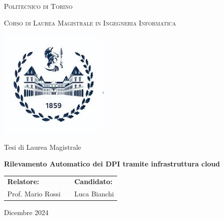 \begin{titlepage}
    \centering
    {\scshape\LARGE Politecnico di Torino \par}
    \vspace{0.5cm}
    
    {\scshape\Large Corso di Laurea Magistrale in Ingegneria Informatica \par}
    \vspace{0.5cm}
    
    \vspace{1cm}
    \includegraphics[width=0.4\textwidth]{figures/polito_logo.jpeg}\par
    \vspace{1cm}
    
    {\Large Tesi di Laurea Magistrale\par}
    \vspace{2cm}
    
    {\bfseries\Huge Rilevamento Automatico dei DPI tramite infrastruttura cloud\par}
    \vspace{2cm}
    
    \begin{tabular}{@{}p{} p{} p{}@{}}
        \textbf{Relatore:} & & \textbf{Candidato:} \\
        Prof. Mario Rossi & & Luca Bianchi \\
    \end{tabular}
    
    \vfill
    
    {\large Dicembre 2024\par}
\end{titlepage}
